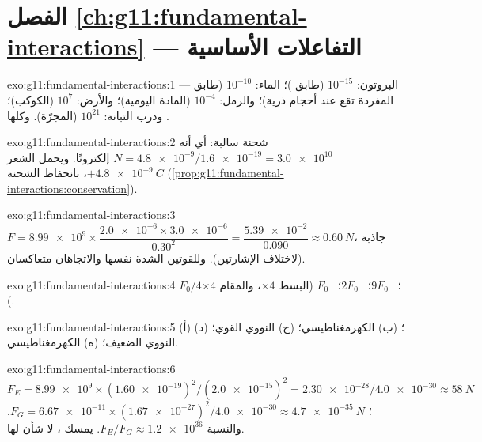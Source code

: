 \section*{الفصل \ref{ch:g11:fundamental-interactions} --- التفاعلات الأساسية}

\begin{solution}{exo:g11:fundamental-interactions:1}
البروتون: $10^{-15}$ (طابق )؛  الماء: $10^{-10}$
(طابق  ---  المفردة تقع عند أحجام ذرية)؛ والرمل:
$10^{-4}$ (المادة اليومية)؛ والأرض: $10^{7}$ (الكوكب)؛ ودرب التبانة:
$10^{21}$ (المجرّة). وكلها .
\end{solution}

\begin{solution}{exo:g11:fundamental-interactions:2}
شحنة سالبة: أي أنه \emph{}
$N = \num{4.8e-9}/\num{1.6e-19} = \num{3.0e10}$ إلكترونًا. ويحمل الشعر
$+\qty{4.8e-9}{C}$، بانحفاظ الشحنة
(\cref{prop:g11:fundamental-interactions:conservation}).
\end{solution}

\begin{solution}{exo:g11:fundamental-interactions:3}
$F = \num{8.99e9} \times \dfrac{\num{2.0e-6} \times \num{3.0e-6}}{0.30^2}
= \dfrac{\num{5.39e-2}}{0.090} \approx \qty{0.60}{N}$، جاذبة
(لاختلاف الإشارتين). وللقوتين الشدة نفسها والاتجاهان
متعاكسان.
\end{solution}

\begin{solution}{exo:g11:fundamental-interactions:4}
$F_0/4$؛ \ $9F_0$؛ \ $2F_0$؛ \ $F_0$ (البسط $\times 4$، والمقام
$\times 4$).
\end{solution}

\begin{solution}{exo:g11:fundamental-interactions:5}
(أ) ؛ (ب) الكهرمغناطيسي؛ (ج) النووي القوي؛ (د) النووي الضعيف؛
(ه) الكهرمغناطيسي.
\end{solution}

\begin{solution}{exo:g11:fundamental-interactions:6}
$F_E = \num{8.99e9} \times (\num{1.60e-19})^2/(\num{2.0e-15})^2
= \num{2.30e-28}/\num{4.0e-30} \approx \qty{58}{N}$؛
$F_G = \num{6.67e-11} \times (\num{1.67e-27})^2/\num{4.0e-30}
\approx \qty{4.7e-35}{N}$. والنسبة $F_E/F_G \approx \num{1.2e36}$.  يمسك ،  لا شأن لها.
\end{solution}

